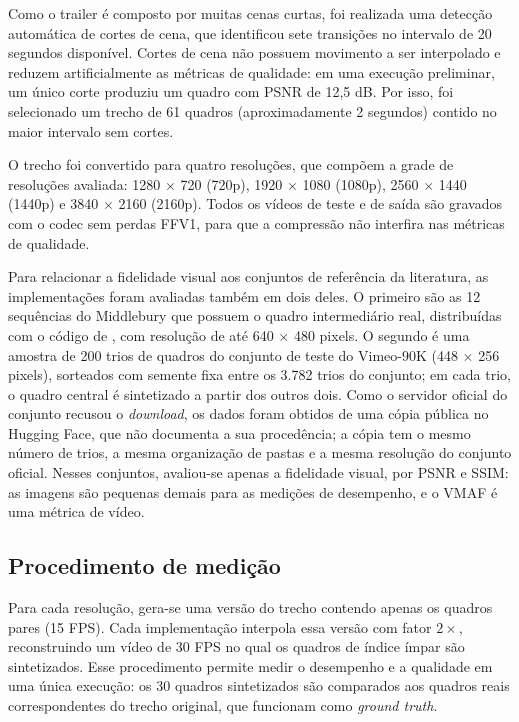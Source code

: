 \documentclass[
    12pt,                %
    openright,           %
    oneside,             %
    a4paper,             %
    english,             %
    brazil               %
]{abntex2}
\begin{document}
Como o trailer é composto por muitas cenas curtas, foi realizada uma detecção automática de cortes de cena, que identificou sete transições no intervalo de 20 segundos disponível. Cortes de cena não possuem movimento a ser interpolado e reduzem artificialmente as métricas de qualidade: em uma execução preliminar, um único corte produziu um quadro com PSNR de 12,5 dB. Por isso, foi selecionado um trecho de 61 quadros (aproximadamente 2 segundos) contido no maior intervalo sem cortes.

O trecho foi convertido para quatro resoluções, que compõem a grade de resoluções avaliada: 1280 $\times$ 720 (720p), 1920 $\times$ 1080 (1080p), 2560 $\times$ 1440 (1440p) e 3840 $\times$ 2160 (2160p). Todos os vídeos de teste e de saída são gravados com o codec sem perdas FFV1, para que a compressão não interfira nas métricas de qualidade.

Para relacionar a fidelidade visual aos conjuntos de referência da literatura, as implementações foram avaliadas também em dois deles. O primeiro são as 12 sequências do Middlebury que possuem o quadro intermediário real, distribuídas com o código de , com resolução de até 640 $\times$ 480 pixels. O segundo é uma amostra de 200 trios de quadros do conjunto de teste do Vimeo-90K \cite{Xue2019} (448 $\times$ 256 pixels), sorteados com semente fixa entre os 3.782 trios do conjunto; em cada trio, o quadro central é sintetizado a partir dos outros dois. Como o servidor oficial do conjunto recusou o \textit{download}, os dados foram obtidos de uma cópia pública no Hugging Face, que não documenta a sua procedência; a cópia tem o mesmo número de trios, a mesma organização de pastas e a mesma resolução do conjunto oficial. Nesses conjuntos, avaliou-se apenas a fidelidade visual, por PSNR e SSIM: as imagens são pequenas demais para as medições de desempenho, e o VMAF é uma métrica de vídeo.

\subsection{Procedimento de medição}
\label{sec:procedimento}

Para cada resolução, gera-se uma versão do trecho contendo apenas os quadros pares (15 FPS). Cada implementação interpola essa versão com fator $2\times$, reconstruindo um vídeo de 30 FPS no qual os quadros de índice ímpar são sintetizados. Esse procedimento permite medir o desempenho e a qualidade em uma única execução: os 30 quadros sintetizados são comparados aos quadros reais correspondentes do trecho original, que funcionam como \textit{ground truth}.
\end{document}
